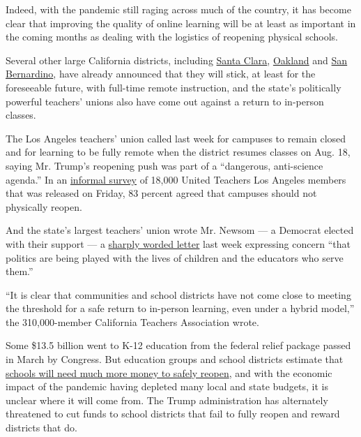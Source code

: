 Indeed, with the pandemic still raging across much of the country, it
has become clear that improving the quality of online learning will be
at least as important in the coming months as dealing with the logistics
of reopening physical schools.

Several other large California districts, including
\href{https://www.sfchronicle.com/bayarea/article/Santa-Clara-area-school-district-delays-return-to-15403000.php}{Santa
Clara}, \href{https://www.ousd.org/covid-19updates}{Oakland} and
\href{https://www.sbcusd.com/news/what_s_new/July22020_message_from_interim_superintendent}{San
Bernardino}, have already announced that they will stick, at least for
the foreseeable future, with full-time remote instruction, and the
state's politically powerful teachers' unions also have come out against
a return to in-person classes.

The Los Angeles teachers' union called last week for campuses to remain
closed and for learning to be fully remote when the district resumes
classes on Aug. 18, saying Mr. Trump's reopening push was part of a
``dangerous, anti-science agenda.'' In an
\href{https://www.utla.net/news/poll-results-83-utla-members-say-lausd-schools-should-not-physically-reopen-august-18}{informal
survey} of 18,000 United Teachers Los Angeles members that was released
on Friday, 83 percent agreed that campuses should not physically reopen.

And the state's largest teachers' union wrote Mr. Newsom --- a Democrat
elected with their support --- a
\href{http://image.cta-mailings.org/lib/fe8a1574766d017b7c/m/2/2167fb86-b25b-4ce3-9bc7-4248b105a80d.pdf?fbclid=IwAR2QqpANyH9HwsSJJjE1-1NyK_r8bxIcrqucygKKV1ehQ-i_JYCwt3kksZg}{sharply
worded letter} last week expressing concern ``that politics are being
played with the lives of children and the educators who serve them.''

``It is clear that communities and school districts have not come close
to meeting the threshold for a safe return to in-person learning, even
under a hybrid model,'' the 310,000-member California Teachers
Association wrote.

Some \$13.5 billion went to K-12 education from the federal relief
package passed in March by Congress. But education groups and school
districts estimate that
\href{https://www.nytimes3xbfgragh.onion/2020/07/09/us/schools-reopening-trump.html}{schools
will need much more money to safely reopen}, and with the economic
impact of the pandemic having depleted many local and state budgets, it
is unclear where it will come from. The Trump administration has
alternately threatened to cut funds to school districts that fail to
fully reopen and reward districts that do.

